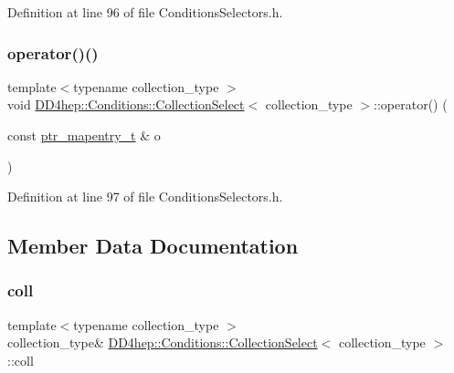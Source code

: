 Definition at line 96 of file Conditions\+Selectors.\+h.

\hypertarget{class_d_d4hep_1_1_conditions_1_1_collection_select_a8015cdd01adc5d11fc52062df45e961e}{}\label{class_d_d4hep_1_1_conditions_1_1_collection_select_a8015cdd01adc5d11fc52062df45e961e} 
\subsubsection{\texorpdfstring{operator()()}{operator()()}\hspace{0.1cm}{\footnotesize\ttfamily [4/4]}}
{\footnotesize\ttfamily template$<$typename collection\+\_\+type $>$ \\
void \hyperlink{class_d_d4hep_1_1_conditions_1_1_collection_select}{D\+D4hep\+::\+Conditions\+::\+Collection\+Select}$<$ collection\+\_\+type $>$\+::operator() (\begin{DoxyParamCaption}\item[{const \hyperlink{class_d_d4hep_1_1_conditions_1_1_cond_____oper_a0949e4bd5f90cd3fae2394cf30983973}{ptr\+\_\+mapentry\+\_\+t} \&}]{o }\end{DoxyParamCaption})\hspace{0.3cm}{\ttfamily [inline]}}



Definition at line 97 of file Conditions\+Selectors.\+h.



\subsection{Member Data Documentation}
\hypertarget{class_d_d4hep_1_1_conditions_1_1_collection_select_add9428a8c7577a9d09c7148c4ba1fcd9}{}\label{class_d_d4hep_1_1_conditions_1_1_collection_select_add9428a8c7577a9d09c7148c4ba1fcd9} 
\subsubsection{\texorpdfstring{coll}{coll}}
{\footnotesize\ttfamily template$<$typename collection\+\_\+type $>$ \\
collection\+\_\+type\& \hyperlink{class_d_d4hep_1_1_conditions_1_1_collection_select}{D\+D4hep\+::\+Conditions\+::\+Collection\+Select}$<$ collection\+\_\+type $>$\+::coll\hspace{0.3cm}{\ttfamily [private]}}



